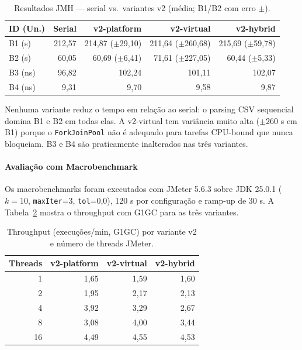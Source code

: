 \begin{table}[H]
\centering
\small
\begin{tabular}{lrrrr}
\hline
\textbf{ID (Un.)} & \textbf{Serial} & \textbf{v2-platform} & \textbf{v2-virtual} & \textbf{v2-hybrid} \\
\hline
B1 (s)  & 212{,}57 & 214{,}87 ($\pm$29{,}10) & 211{,}64 ($\pm$260{,}68) & 215{,}69 ($\pm$59{,}78) \\
B2 (s)  &  60{,}05 &  60{,}69 ($\pm$6{,}41)  &  71{,}61 ($\pm$227{,}05) &  60{,}44 ($\pm$5{,}33) \\
B3 (ns) &  96{,}82 & 102{,}24 & 101{,}11 & 102{,}07 \\
B4 (ns) &   9{,}31 &   9{,}70 &   9{,}58 &   9{,}87 \\
\hline
\end{tabular}
\caption{Resultados JMH --- serial vs.\ variantes v2 (média; B1/B2 com erro $\pm$).}
\label{tab:jmh-v2-all}
\end{table}

Nenhuma variante reduz o tempo em relação ao serial: o parsing CSV sequencial
domina B1 e B2 em todas elas. A v2-virtual tem variância muito alta ($\pm$260 s
em B1) porque o \texttt{ForkJoinPool} não é adequado para tarefas CPU-bound que
nunca bloqueiam. B3 e B4 são praticamente inalterados nas três variantes.

\paragraph{Avaliação com Macrobenchmark}

Os macrobenchmarks foram executados com JMeter 5.6.3 sobre JDK 25.0.1 ($k=10$,
\texttt{maxIter}=3, \texttt{tol}=0,0), 120 s por configuração e ramp-up de 30 s.
A Tabela~\ref{tab:jmeter-v2-all} mostra o throughput com G1GC para as três variantes.

\begin{table}[H]
\centering
\begin{tabular}{rrrr}
\hline
\textbf{Threads} & \textbf{v2-platform} & \textbf{v2-virtual} & \textbf{v2-hybrid} \\
\hline
 1 & 1{,}65 & 1{,}59 & 1{,}60 \\
 2 & 1{,}95 & 2{,}17 & 2{,}13 \\
 4 & 3{,}92 & 3{,}29 & 2{,}67 \\
 8 & 3{,}08 & 4{,}00 & 3{,}44 \\
16 & 4{,}49 & 4{,}55 & 4{,}53 \\
\hline
\end{tabular}
\caption{Throughput (execuções/min, G1GC) por variante v2 e número de threads JMeter.}
\label{tab:jmeter-v2-all}
\end{table}

